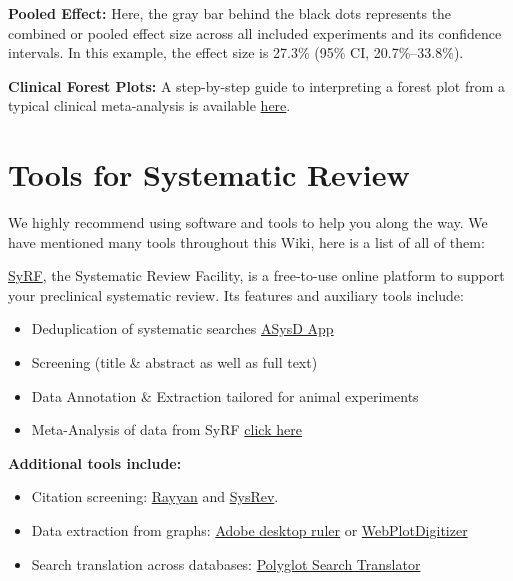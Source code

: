 \documentclass[
]{book}
\providecommand{\tightlist}{%
  \setlength{\itemsep}{0pt}\setlength{\parskip}{0pt}}
\begin{document}
\textbf{Pooled Effect:}
Here, the gray bar behind the black dots represents the combined or pooled effect size across all included experiments and its confidence intervals. In this example, the effect size is 27.3\% (95\% CI, 20.7\%--33.8\%).

\textbf{Clinical Forest Plots:} A step-by-step guide to interpreting a forest plot from a typical clinical meta-analysis is available \href{https://s4be.cochrane.org/blog/2016/07/11/tutorial-read-forest-plot/}{here}.

\hypertarget{tools-for-systematic-review}{%
\chapter{Tools for Systematic Review}\label{tools-for-systematic-review}}

We highly recommend using software and tools to help you along the way. We have mentioned many tools throughout this Wiki, here is a list of all of them:

\href{https://syrf.org.uk/}{SyRF}, the Systematic Review Facility, is a free-to-use online platform to support your preclinical systematic review. Its features and auxiliary tools include:

\begin{itemize}
\tightlist
\item
  Deduplication of systematic searches \href{https://camarades.shinyapps.io/RDedup/}{ASysD App}
\item
  Screening (title \& abstract as well as full text)
\item
  Data Annotation \& Extraction tailored for animal experiments
\item
  Meta-Analysis of data from SyRF \href{https://camarades.shinyapps.io/meta-analysis-app/}{click here}
\end{itemize}

\textbf{Additional tools include:}

\begin{itemize}
\tightlist
\item
  Citation screening: \href{https://rayyan.qcri.org/welcome}{Rayyan} and \href{https://sysrev.com/}{SysRev}.
\item
  Data extraction from graphs: \href{https://helpx.adobe.com/acrobat/using/grids-guides-measurements-pdfs.html}{Adobe desktop ruler} or \href{https://automeris.io/WebPlotDigitizer/}{WebPlotDigitizer}
\item
  Search translation across databases: \href{https://sr-accelerator.com/\#/polyglot}{Polyglot Search Translator}
\end{itemize}
\end{document}
